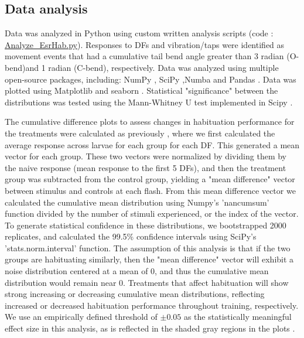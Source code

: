 \documentclass[9.5pt,lineno]{RandlettLab_elife}
\begin{document}
{\subsection{Data analysis}

Data was analyzed in Python using custom written analysis scripts (code : \href{https://github.com/owenrandlett/2025_HabEstrogen/blob/main/code/Analyze_EsrHab.py}{Analyze\_EsrHab.py}). 
Responses to DFs and vibration/taps were identified as movement events that had a cumulative tail bend angle greater than 3 radian (O-bend)and 1 radian (C-bend), respectively. Data was analyzed using multiple open-source packages, including: NumPy \citep{Harris2020-bg}, SciPy \citep{Virtanen2020-sz},Numba \citep{lam2015numba} and Pandas \citep{mckinney-proc-scipy-2010}.
Data was plotted using Matplotlib \citep{Hunter2007-ub} and seaborn \citep{Waskom2021-ah}.
Statistical "significance" between the distributions was tested using the Mann-Whitney U test implemented in Scipy \citep{Virtanen2020-sz}.

The cumulative difference plots to assess changes in habituation performance for the treatments were calculated as previously \citep{Randlett2019-fj}, where we first
calculated the average response across larvae for each group for each DF.
This generated a mean vector for each group. 
These two vectors were normalized by dividing them by the naive response (mean response to the first 5 DFs), and then the treatment group was subtracted from the control group, yielding a "mean difference" vector between stimulus and controls at each flash. 
From this mean difference vector we calculated the cumulative mean distribution using Numpy's 'nancumsum' function divided by the number of stimuli experienced, or the index of the vector. 
To generate statistical confidence in these distributions, we bootstrapped 2000 replicates, and calculated the 99.5\% confidence intervals using SciPy's 'stats.norm.interval' function.
The assumption of this analysis is that if the two groups are habituating similarly, then the "mean difference" vector will exhibit a noise distribution centered at a mean of 0, and thus the cumulative mean distribution would remain near 0. 
Treatments that affect habituation will show strong increasing or decreasing cumulative mean distributions, reflecting increased or decreased habituation performance throughout
training, respectively.
We use an empirically defined threshold of $\pm0.05$ as the statistically meaningful effect size in this analysis, as is reflected in the shaded gray regions in the plots \citep{Randlett2019-fj}.


}
\end{document}
